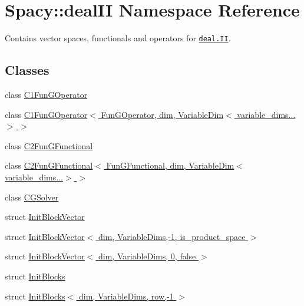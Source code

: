 \hypertarget{namespaceSpacy_1_1dealII}{\section{Spacy\-:\-:deal\-I\-I Namespace Reference}
\label{namespaceSpacy_1_1dealII}
}


Contains vector spaces, functionals and operators for \href{www.deal.org}{\tt deal.\-I\-I}.  


\subsection*{Classes}
\begin{DoxyCompactItemize}
\item 
class \hyperlink{classSpacy_1_1dealII_1_1C1FunGOperator}{C1\-Fun\-G\-Operator}
\item 
class \hyperlink{classSpacy_1_1dealII_1_1C1FunGOperator_3_01FunGOperator_00_01dim_00_01VariableDim_3_01variable__dims_8_8_8_4_01_4}{C1\-Fun\-G\-Operator$<$ Fun\-G\-Operator, dim, Variable\-Dim$<$ variable\-\_\-dims...$>$ $>$}
\item 
class \hyperlink{classSpacy_1_1dealII_1_1C2FunGFunctional}{C2\-Fun\-G\-Functional}
\item 
class \hyperlink{classSpacy_1_1dealII_1_1C2FunGFunctional_3_01FunGFunctional_00_01dim_00_01VariableDim_3_01variable__dims_8_8_8_4_01_4}{C2\-Fun\-G\-Functional$<$ Fun\-G\-Functional, dim, Variable\-Dim$<$ variable\-\_\-dims...$>$ $>$}
\item 
class \hyperlink{classSpacy_1_1dealII_1_1CGSolver}{C\-G\-Solver}
\item 
struct \hyperlink{structSpacy_1_1dealII_1_1InitBlockVector}{Init\-Block\-Vector}
\item 
struct \hyperlink{structSpacy_1_1dealII_1_1InitBlockVector_3_01dim_00_01VariableDims_00-1_00_01is__product__space_01_4}{Init\-Block\-Vector$<$ dim, Variable\-Dims,-\/1, is\-\_\-product\-\_\-space $>$}
\item 
struct \hyperlink{structSpacy_1_1dealII_1_1InitBlockVector_3_01dim_00_01VariableDims_00_010_00_01false_01_4}{Init\-Block\-Vector$<$ dim, Variable\-Dims, 0, false $>$}
\item 
struct \hyperlink{structSpacy_1_1dealII_1_1InitBlocks}{Init\-Blocks}
\item 
struct \hyperlink{structSpacy_1_1dealII_1_1InitBlocks_3_01dim_00_01VariableDims_00_01row_00-1_01_4}{Init\-Blocks$<$ dim, Variable\-Dims, row,-\/1 $>$}
\item 

\end{DoxyCompactItemize}
